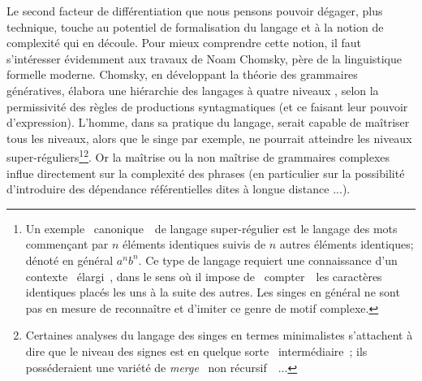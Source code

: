 \documentclass{article}
\begin{document}
		Le second facteur de différentiation que nous pensons pouvoir dégager, plus technique, touche au potentiel de formalisation du langage et à la notion de complexité qui en découle. Pour mieux comprendre cette notion, il faut s'intéresser évidemment aux travaux de Noam Chomsky, père de la linguistique formelle moderne. Chomsky, en développant la théorie des grammaires génératives, élabora une hiérarchie des langages à quatre niveaux \autocite{chomsky1956}, selon la permissivité des règles de productions syntagmatiques (et ce faisant leur pouvoir d'expression). L'homme, dans sa pratique du langage, serait capable de maîtriser tous les niveaux, alors que le singe par exemple, ne pourrait atteindre les niveaux super-réguliers\footnote{Un exemple \guillemotleft~canonique~\guillemotright~de langage super-régulier est le langage des mots commençant par $n$ éléments identiques suivis de $n$ autres éléments identiques; dénoté en général $a^nb^n$. Ce type de langage requiert une connaissance d'un contexte \guillemotleft~élargi~\guillemotright, dans le sens où il impose de \guillemotleft~compter~\guillemotright~les caractères identiques placés les uns à la suite des autres. Les singes en général ne sont pas en mesure de reconnaître et d'imiter ce genre de motif complexe.}\footnote{Certaines analyses du langage des singes en termes minimalistes \autocite{chomsky1995} s'attachent à dire que le niveau des signes est en quelque sorte \guillemotleft~intermédiaire~\guillemotright; ils posséderaient une variété de \textit{merge} \guillemotleft~non récursif~\guillemotright~\autocite{dehaene2017}...}. Or la maîtrise ou la non maîtrise de grammaires complexes influe directement sur la complexité des phrases (en particulier sur la possibilité d'introduire des dépendance référentielles dites à longue distance \autocite{shieber1985}...).\\
		
\end{document}
